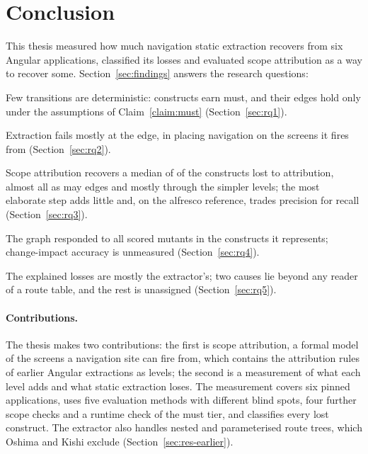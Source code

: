 \section{Conclusion}
\label{ch:conclusion}

This thesis measured how much navigation static extraction recovers from six Angular
applications, classified its losses and evaluated scope attribution as a way to recover some. Section~\ref{sec:findings} answers the research questions:
\begin{description}[nosep,leftmargin=2.6em,labelwidth=2.2em]
\item[RQ1] Few transitions are deterministic: \CensusMustSites{} constructs earn must, and their
edges hold only under the assumptions of Claim~\ref{claim:must} (Section~\ref{sec:rq1}).
\item[RQ2] Extraction fails mostly at the edge, in placing navigation on the screens it fires from
(Section~\ref{sec:rq2}).
\item[RQ3] Scope attribution recovers a median of \AttrRecoveredMedian{} of the constructs lost to
attribution, almost all as may edges and mostly through the simpler levels; the most elaborate step adds
little and, on the alfresco reference, trades precision for recall (Section~\ref{sec:rq3}).
\item[RQ4] The graph responded to all \MutScored{} scored mutants in the constructs it represents;
change-impact accuracy is unmeasured (Section~\ref{sec:rq4}).
\item[RQ5] The explained losses are mostly the extractor's; two causes lie beyond any reader of a route table, and
the rest is unassigned (Section~\ref{sec:rq5}).
\end{description}

\paragraph{Contributions.} The thesis makes two contributions: the first is scope attribution, a
formal model of the screens a navigation site can fire from, which contains the attribution
rules of earlier Angular extractions as levels; the second is a measurement of what each level
adds and what static extraction loses. The measurement covers six pinned applications, uses five evaluation methods
with different blind spots, four further scope checks and a runtime check of the must tier, and classifies every lost construct. The extractor also handles nested and parameterised
route trees, which Oshima and Kishi exclude (Section~\ref{sec:res-earlier}).

